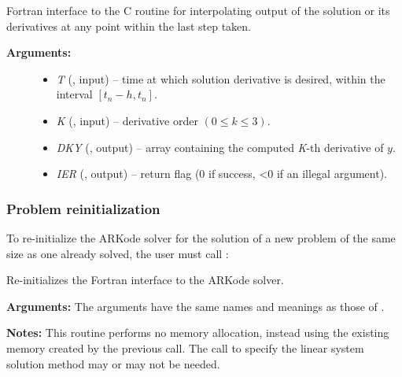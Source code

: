 \documentclass[letterpaper,10pt,english]{sphinxmanual}
\begin{document}
\begin{fulllineitems}
\label{f_interface/Usage:f/_/FARKDKY}
Fortran interface to the C routine  for
interpolating output of the solution or its derivatives at any
point within the last step taken.
\begin{description}
\item[{\textbf{Arguments:}}] \leavevmode\begin{itemize}
\item {} 
\emph{T} (, input) -- time at which solution derivative
is desired, within the interval \([t_n-h,t_n]\).

\item {} 
\emph{K} (, input) -- derivative order \((0 \le k \le 3)\).

\item {} 
\emph{DKY} (, output) -- array containing the computed
\emph{K}-th derivative of \(y\).

\item {} 
\emph{IER} (, output) -- return flag (0 if success, \textless{}0 if an
illegal argument).

\end{itemize}

\end{description}

\end{fulllineitems}



\subsubsection{Problem reinitialization}
\label{f_interface/Usage:finterface-reinit}\label{f_interface/Usage:problem-reinitialization}
To re-initialize the ARKode solver for the solution of a new
problem of the same size as one already solved, the user must call
{\hyperref[f_interface/Usage:f/_/FARKREINIT]{\emph{}}}:

\begin{fulllineitems}
\label{f_interface/Usage:f/_/FARKREINIT}
Re-initializes the Fortran interface to the ARKode solver.

\textbf{Arguments:}  The arguments have the same names and meanings as those of
{\hyperref[f_interface/Usage:f/_/FARKMALLOC]{\emph{}}}.

\textbf{Notes:}
This routine performs no memory allocation, instead using the
existing memory created by the previous {\hyperref[f_interface/Usage:f/_/FARKMALLOC]{\emph{}}}
call.  The call to specify the linear system solution method may
or may not be needed.

\end{fulllineitems}
\end{document}
